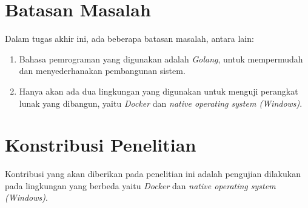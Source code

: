 \section{Batasan Masalah}
Dalam tugas akhir ini, ada beberapa batasan masalah, antara lain:
\begin{enumerate}[nolistsep,leftmargin=0.5cm]
  \item Bahasa pemrograman yang digunakan adalah \textit{Golang}, untuk mempermudah dan menyederhanakan pembangunan sistem.
  \item Hanya akan ada dua lingkungan yang digunakan untuk menguji perangkat lunak yang dibangun, yaitu \textit{Docker} dan \textit{native operating system (Windows)}.
\\
\end{enumerate}

\section{Konstribusi Penelitian}
Kontribusi yang akan diberikan pada penelitian ini adalah pengujian dilakukan pada lingkungan yang berbeda yaitu \textit{Docker} dan \textit{native operating system (Windows)}.\\


